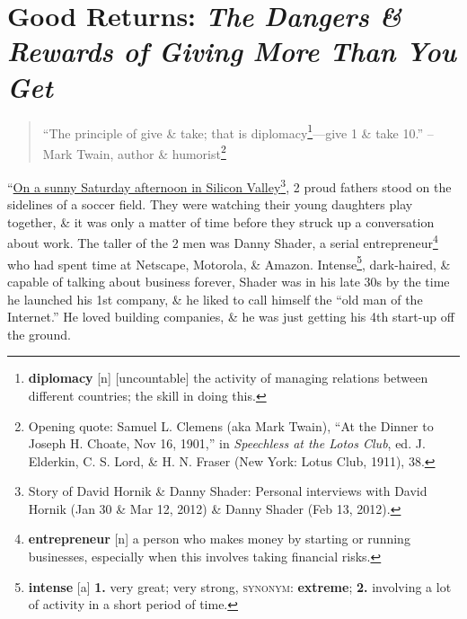 \documentclass[oneside]{book}
\numberwithin{equation}{section}
\begin{document}
\section{Good Returns: \textit{The Dangers \& Rewards of Giving More Than You Get}}
\begin{quotation}
	``The principle of give \& take; that is diplomacy\footnote{\textbf{diplomacy} [n] [uncountable] the activity of managing relations between different countries; the skill in doing this.}---give 1 \& take 10.'' -- Mark Twain, author \& humorist\footnote{Opening quote: Samuel L. Clemens (aka Mark Twain), ``At the Dinner to Joseph H. Choate, Nov 16, 1901,'' in \textit{Speechless at the Lotos Club}, ed. J. Elderkin, C. S. Lord, \& H. N. Fraser (New York: Lotus Club, 1911), 38.}
\end{quotation}
``\underline{On a sunny Saturday afternoon in Silicon Valley}\footnote{Story of David Hornik \& Danny Shader: Personal interviews with David Hornik (Jan 30 \& Mar 12, 2012) \& Danny Shader (Feb 13, 2012).}, 2 proud fathers stood on the sidelines of a soccer field. They were watching their young daughters play together, \& it was only a matter of time before they struck up a conversation about work. The taller of the 2 men was Danny Shader, a serial entrepreneur\footnote{\textbf{entrepreneur} [n] a person who makes money by starting or running businesses, especially when this involves taking financial risks.} who had spent time at Netscape, Motorola, \& Amazon. Intense\footnote{\textbf{intense} [a] \textbf{1.} very great; very strong, \textsc{synonym}: \textbf{extreme}; \textbf{2.} involving a lot of activity in a short period of time.}, dark-haired, \& capable of talking about business forever, Shader was in his late 30s by the time he launched his 1st company, \& he liked to call himself the ``old man of the Internet.'' He loved building companies, \& he was just getting his 4th start-up off the ground.
\end{document}
